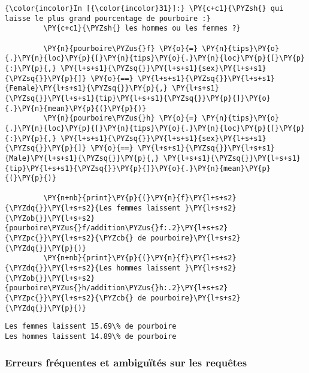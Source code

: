     \begin{Verbatim}[commandchars=\\\{\},frame=single,framerule=0.3mm,rulecolor=\color{cellframecolor}]
{\color{incolor}In [{\color{incolor}31}]:} \PY{c+c1}{\PYZsh{} qui laisse le plus grand pourcentage de pourboire :}
         \PY{c+c1}{\PYZsh{} les hommes ou les femmes ?}
         
         \PY{n}{pourboire\PYZus{}f} \PY{o}{=} \PY{n}{tips}\PY{o}{.}\PY{n}{loc}\PY{p}{[}\PY{n}{tips}\PY{o}{.}\PY{n}{loc}\PY{p}{[}\PY{p}{:}\PY{p}{,} \PY{l+s+s1}{\PYZsq{}}\PY{l+s+s1}{sex}\PY{l+s+s1}{\PYZsq{}}\PY{p}{]} \PY{o}{==} \PY{l+s+s1}{\PYZsq{}}\PY{l+s+s1}{Female}\PY{l+s+s1}{\PYZsq{}}\PY{p}{,} \PY{l+s+s1}{\PYZsq{}}\PY{l+s+s1}{tip}\PY{l+s+s1}{\PYZsq{}}\PY{p}{]}\PY{o}{.}\PY{n}{mean}\PY{p}{(}\PY{p}{)}
         \PY{n}{pourboire\PYZus{}h} \PY{o}{=} \PY{n}{tips}\PY{o}{.}\PY{n}{loc}\PY{p}{[}\PY{n}{tips}\PY{o}{.}\PY{n}{loc}\PY{p}{[}\PY{p}{:}\PY{p}{,} \PY{l+s+s1}{\PYZsq{}}\PY{l+s+s1}{sex}\PY{l+s+s1}{\PYZsq{}}\PY{p}{]} \PY{o}{==} \PY{l+s+s1}{\PYZsq{}}\PY{l+s+s1}{Male}\PY{l+s+s1}{\PYZsq{}}\PY{p}{,} \PY{l+s+s1}{\PYZsq{}}\PY{l+s+s1}{tip}\PY{l+s+s1}{\PYZsq{}}\PY{p}{]}\PY{o}{.}\PY{n}{mean}\PY{p}{(}\PY{p}{)}
         
         \PY{n+nb}{print}\PY{p}{(}\PY{n}{f}\PY{l+s+s2}{\PYZdq{}}\PY{l+s+s2}{Les femmes laissent }\PY{l+s+s2}{\PYZob{}}\PY{l+s+s2}{pourboire\PYZus{}f/addition\PYZus{}f:.2}\PY{l+s+s2}{\PYZpc{}}\PY{l+s+s2}{\PYZcb{} de pourboire}\PY{l+s+s2}{\PYZdq{}}\PY{p}{)}
         \PY{n+nb}{print}\PY{p}{(}\PY{n}{f}\PY{l+s+s2}{\PYZdq{}}\PY{l+s+s2}{Les hommes laissent }\PY{l+s+s2}{\PYZob{}}\PY{l+s+s2}{pourboire\PYZus{}h/addition\PYZus{}h:.2}\PY{l+s+s2}{\PYZpc{}}\PY{l+s+s2}{\PYZcb{} de pourboire}\PY{l+s+s2}{\PYZdq{}}\PY{p}{)}
\end{Verbatim}


    \begin{Verbatim}[commandchars=\\\{\},frame=single,framerule=0.3mm,rulecolor=\color{cellframecolor}]
Les femmes laissent 15.69\% de pourboire
Les hommes laissent 14.89\% de pourboire
\end{Verbatim}

    \hypertarget{erreurs-fruxe9quentes-et-ambiguuxeftuxe9s-sur-les-requuxeates}{%
\subsubsection{Erreurs fréquentes et ambiguïtés sur les
requêtes}\label{erreurs-fruxe9quentes-et-ambiguuxeftuxe9s-sur-les-requuxeates}}

